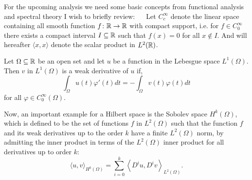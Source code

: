 For the upcoming analysis we need some basic concepts from functional analysis and spectral theory I wish to briefly review:
~\newline ~\newline
Let $C_{c}^{\infty}$ denote the linear space containing all smooth function $f \colon \mathbb{R} \rightarrow \mathbb{R}$ with compact support, i.e. for $f \in C_{0}^{\infty}$ there exists a compact interval $I \subseteq \mathbb{R}$ such that $f(x) = 0$ for all $x \notin I$. And will hereafter $\langle x, x \rangle$ denote the scalar product in $L^{2}(\mathbb{R})$.

\begin{definition}
	Let $\Omega \subseteq \mathbb{R}$ be an open set and let $u$ be a function in the Lebesgue space $L^{1}(\Omega)$. Then $v$ in $L^{1}(\Omega)$ is a weak derivative of $u$ if, 
	\[ \int_{\Omega} u(t)\varphi'(t) dt = -\int_{\Omega} v(t) \varphi(t) dt \]
for all $\varphi \in C_{0}^{\infty}(\Omega)$. 
\end{definition}
Now, an important example for a Hilbert space is the Sobolev space $H^{k}(\Omega)$, which is defined to be the set of functions $f$ in $L^{2}(\Omega)$ such that the function $f$ and its weak derivatives up to the order $k$ have a finite $L^{2}(\Omega)$ norm, by admitting the inner product in terms of the $L^{2}(\Omega)$ inner product for all derivatives up to order $k$: 
	\[ \langle u , v \rangle_{H^{k}(\Omega)} = \sum_{i=0}^{k} \left\langle D^{i}u , D^{i} v \right\rangle_{L^{2}(\Omega)}. \] 	

